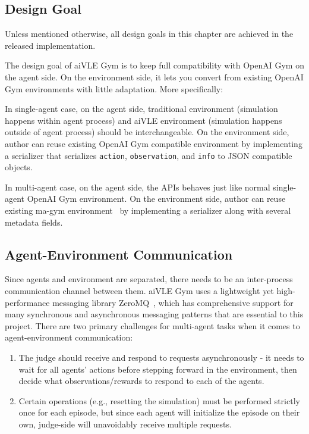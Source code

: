 \subsection{Design Goal}
Unless mentioned otherwise, all design goals in this chapter are achieved in the released implementation. 

The design goal of aiVLE Gym is to keep full compatibility with OpenAI Gym on the agent side. On the environment side, it lets you convert from existing OpenAI Gym environments with little adaptation. More specifically:

In single-agent case, on the agent side, traditional environment (simulation happens within agent process) and aiVLE environment (simulation happens outside of agent process) should be interchangeable. On the environment side, author can reuse existing OpenAI Gym compatible environment by implementing a serializer that serializes \texttt{action}, \texttt{observation}, and \texttt{info} to JSON compatible objects.

In multi-agent case, on the agent side, the APIs behaves just like normal single-agent OpenAI Gym environment. On the environment side, author can reuse existing ma-gym environment~\cite{magym} by implementing a serializer along with several metadata fields. 

\subsection{Agent-Environment Communication}
\label{ss:agent-env-communication}
Since agents and environment are separated, there needs to be an inter-process communication channel between them. aiVLE Gym uses a lightweight yet high-performance messaging library ZeroMQ~\cite{zeromq}, which has comprehensive support for many synchronous and asynchronous messaging patterns that are essential to this project. There are two primary challenges for multi-agent tasks when it comes to agent-environment communication:
\begin{enumerate}
    \item The judge should receive and respond to requests asynchronously - it needs to wait for all agents' actions before stepping forward in the environment, then decide what observations/rewards to respond to each of the agents.
    \item Certain operations (e.g., resetting the simulation) must be performed strictly once for each episode, but since each agent will initialize the episode on their own, judge-side will unavoidably receive multiple requests.
\end{enumerate}

